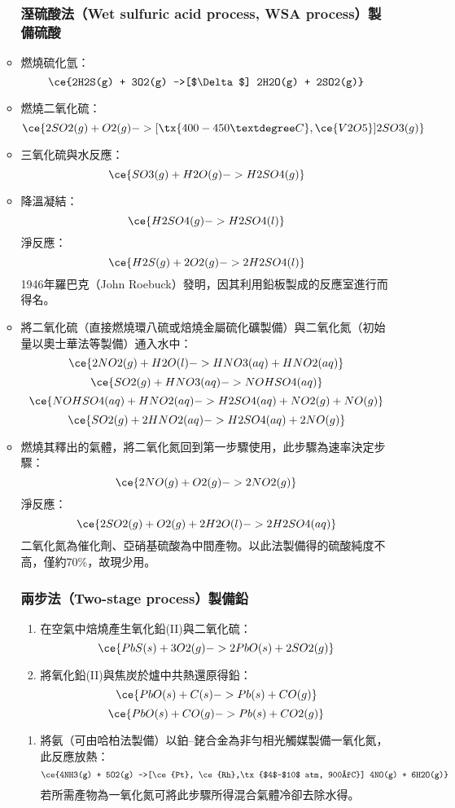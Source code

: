 \documentclass[a4paper,12pt]{report}
\begin{document}
\begin{itemize}
\begin{itemize}
\subsubsection{溼硫酸法（Wet sulfuric acid process, WSA process）製備硫酸}
\ben
\item 燃燒硫化氫：
\[\ce{2H2S(g) + 3O2(g) ->[$\Delta$] 2H2O(g) + 2SO2(g)}\]
\item 燃燒二氧化硫：
\[\ce{2SO2(g) + O2(g) ->[\tx{400-450°C}, \ce{V2O5}] 2SO3(g)}\]
\item 三氧化硫與水反應：
\[\ce{SO3(g) + H2O(g) -> H2SO4(g)}\]
\item 降溫凝結：
\[\ce{H2SO4(g) -> H2SO4(l)}\]
\een
淨反應：
\[\ce{H2S(g) + 2O2(g) -> 2H2SO4(l)}\]
1946年羅巴克（John Roebuck）發明，因其利用鉛板製成的反應室進行而得名。
\ben
\item 將二氧化硫（直接燃燒環八硫或焙燒金屬硫化礦製備）與二氧化氮（初始量以奧士華法等製備）通入水中：
\[\ce{2NO2(g) + H2O(l) -> HNO3(aq) + HNO2(aq)}\]
\[\ce{SO2(g) + HNO3(aq) -> NOHSO4(aq)}\]
\[\ce{NOHSO4(aq) + HNO2(aq) -> H2SO4(aq) + NO2(g) + NO(g)}\]
\[\ce{SO2(g) + 2HNO2(aq) -> H2SO4(aq) + 2NO(g)}\]
\item 燃燒其釋出的氣體，將二氧化氮回到第一步驟使用，此步驟為速率決定步驟：
\[\ce{2NO(g) + O2(g) -> 2NO2(g)}\]
\een
淨反應：
\[\ce{2SO2(g) + O2(g) + 2H2O(l) -> 2H2SO4(aq)}\]
二氧化氮為催化劑、亞硝基硫酸為中間產物。以此法製備得的硫酸純度不高，僅約70\%，故現少用。
\subsubsection{兩步法（Two-stage process）製備鉛}
\begin{enumerate}
\item 在空氣中焙燒產生氧化鉛(II)與二氧化硫：
\[\ce{PbS(s) + 3O2(g) -> 2PbO(s) + 2SO2(g)}\]
\item 將氧化鉛(II)與焦炭於爐中共熱還原得鉛：
\[\ce{PbO(s) + C(s) -> Pb(s) + CO(g)}\]
\[\ce{PbO(s) + CO(g) -> Pb(s) + CO2(g)}\]
\end{enumerate}
\begin{enumerate}
\item 將氨（可由哈柏法製備）以鉑–銠合金為非勻相光觸媒製備一氧化氮，此反應放熱：
\[\ce{4NH3(g) + 5O2(g) ->[\ce{Pt}, \ce{Rh},\tx{$4$-$10$ atm, 900°C}] 4NO(g) + 6H2O(g)}\]
若所需產物為一氧化氮可將此步驟所得混合氣體冷卻去除水得。


\end{enumerate}
\end{itemize}
\end{itemize}
\end{document}
